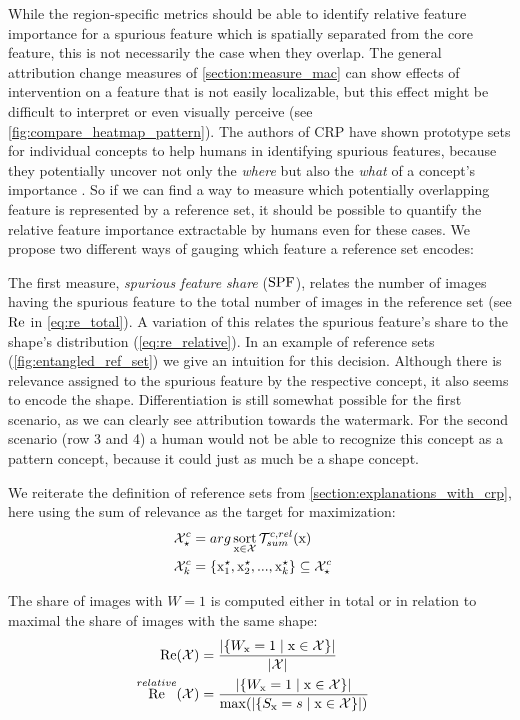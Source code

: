 While the region-specific metrics should be able to identify relative feature importance for a spurious feature which is spatially separated from the core feature, this is not necessarily the case when they overlap. The general attribution change measures of \cref{section:measure_mac} can show effects of intervention on a feature that is not easily localizable, but this effect might be difficult to interpret or even visually perceive (see \cref{fig:compare_heatmap_pattern}). The authors of CRP have shown prototype sets for individual concepts to help humans in identifying spurious features, because they potentially uncover not only the \textit{where} but also the \textit{what} of a concept's importance \citep{Achtibat2023}. So if we can find a way to measure which potentially overlapping feature is represented by a reference set, it should be possible to quantify the relative feature importance extractable by humans even for these cases. 
We propose two different ways of gauging which feature a reference set encodes:

The first measure, \textit{spurious feature share} ($\operatorname*{SPF}$), relates the number of images having the spurious feature to the total number of images in the reference set (see $\operatorname*{Re}$ in \cref{eq:re_total}). A variation of this relates the spurious feature's share to the shape's distribution (\cref{eq:re_relative}). In an example of reference sets (\cref{fig:entangled_ref_set}) we give an intuition for this decision. Although there is relevance assigned to the spurious feature by the respective concept, it also seems to encode the shape. Differentiation is still somewhat possible for the first scenario, as we can clearly see attribution towards the watermark. For the second scenario (row 3 and 4) a human would not be able to recognize this concept as a pattern concept, because it could just as much be a shape concept. 

We reiterate the definition of reference sets from \cref{section:explanations_with_crp}, here using the sum of relevance as the target for maximization: 
\begin{align}\displaystyle
\mathcal{X}_{\star}^{c} &= arg \operatorname*{sort}_{\mathrm{x} \in \mathcal{X}} \mathcal{T}_{sum}^{c,rel}(\mathrm{x}) & 
\notag \\
\mathcal{X}_{k}^{c} &= \{ \mathrm{x}_{1}^{\star},\mathrm{x}_{2}^{\star},..., \mathrm{x}_{k}^{\star} \} \subseteq \mathcal{X}_{\star}^{c} & \notag 
\end{align}

The share of images with $W=1$ is computed either in total or in relation to maximal the share of images with the same shape:
\begin{align}\displaystyle
\operatorname*{Re}(\mathcal{X}) &= \frac{ |\{W_{\mathrm{x}} = 1 \mid \mathrm{x} \in \mathcal{X} \}|   }
{|\mathcal{X}|}  & \label{eq:re_total} \\
\operatorname*{Re}^{relative}(\mathcal{X}) &= \frac{ |\{W_{\mathrm{x}} = 1 \mid \mathrm{x} \in \mathcal{X} \}|   }
{\max(|\{S_{\mathrm{x}} = s \mid \mathrm{x} \in \mathcal{X}\}|)}  &  \label{eq:re_relative}  
\end{align}

